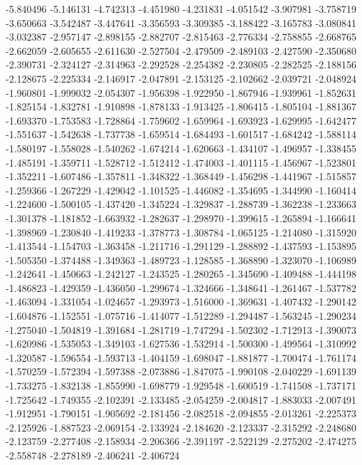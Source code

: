 -5.840496
-5.146131
-4.742313
-4.451980
-4.231831
-4.051542
-3.907981
-3.758719
-3.650663
-3.542487
-3.447641
-3.356593
-3.309385
-3.188422
-3.165783
-3.080841
-3.032387
-2.957147
-2.898155
-2.882707
-2.815463
-2.776334
-2.758855
-2.668765
-2.662059
-2.605655
-2.611630
-2.527504
-2.479509
-2.489103
-2.427590
-2.350680
-2.390731
-2.324127
-2.314963
-2.292528
-2.254382
-2.230805
-2.282525
-2.188156
-2.128675
-2.225334
-2.146917
-2.047891
-2.153125
-2.102662
-2.039721
-2.048924
-1.960801
-1.999032
-2.054307
-1.956398
-1.922950
-1.867946
-1.939961
-1.852631
-1.825154
-1.832781
-1.910898
-1.878133
-1.913425
-1.806415
-1.805104
-1.881367
-1.693370
-1.753583
-1.728864
-1.759602
-1.659964
-1.693923
-1.629995
-1.642477
-1.551637
-1.542638
-1.737738
-1.659514
-1.684493
-1.601517
-1.684242
-1.588114
-1.580197
-1.558028
-1.540262
-1.674214
-1.620663
-1.434107
-1.496957
-1.338455
-1.485191
-1.359711
-1.528712
-1.512412
-1.474003
-1.401115
-1.456967
-1.523801
-1.352211
-1.607486
-1.357811
-1.348322
-1.368449
-1.456298
-1.441967
-1.515857
-1.259366
-1.267229
-1.429042
-1.101525
-1.446082
-1.354695
-1.344990
-1.160414
-1.224600
-1.500105
-1.437420
-1.345224
-1.329837
-1.288739
-1.362238
-1.233663
-1.301378
-1.181852
-1.663932
-1.282637
-1.298970
-1.399615
-1.265894
-1.166641
-1.398969
-1.230840
-1.419233
-1.378773
-1.308784
-1.065125
-1.214080
-1.315920
-1.413544
-1.154703
-1.363458
-1.211716
-1.291129
-1.288892
-1.437593
-1.153895
-1.505350
-1.374488
-1.349363
-1.489723
-1.128585
-1.368890
-1.323070
-1.106989
-1.242641
-1.450663
-1.242127
-1.243525
-1.280265
-1.345690
-1.409488
-1.444198
-1.486823
-1.429359
-1.436050
-1.299674
-1.324666
-1.348641
-1.261467
-1.537782
-1.463094
-1.331054
-1.024657
-1.293973
-1.516000
-1.369631
-1.407432
-1.290142
-1.604876
-1.152551
-1.075716
-1.414077
-1.512289
-1.294487
-1.563245
-1.290234
-1.275040
-1.504819
-1.391684
-1.281719
-1.747294
-1.502302
-1.712913
-1.390073
-1.620986
-1.535053
-1.349103
-1.627536
-1.532914
-1.500300
-1.499564
-1.310992
-1.320587
-1.596554
-1.593713
-1.404159
-1.698047
-1.881877
-1.700474
-1.761174
-1.570259
-1.572394
-1.597388
-2.073886
-1.847075
-1.990108
-2.040229
-1.691139
-1.733275
-1.832138
-1.855990
-1.698779
-1.929548
-1.600519
-1.741508
-1.737171
-1.725642
-1.749355
-2.102391
-2.133485
-2.054259
-2.004817
-1.883033
-2.007491
-1.912951
-1.790151
-1.905692
-2.181456
-2.082518
-2.094855
-2.013261
-2.225373
-2.125926
-1.887523
-2.069154
-2.133924
-2.184620
-2.123337
-2.315292
-2.248680
-2.123759
-2.277408
-2.158934
-2.206366
-2.391197
-2.522129
-2.275202
-2.474275
-2.558748
-2.278189
-2.406241
-2.406724
